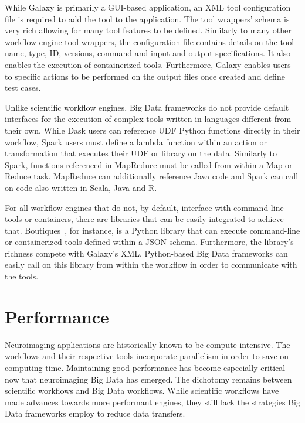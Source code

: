             While Galaxy is primarily a GUI-based application, an XML tool
            configuration file is required to add the tool to the application.
            The tool wrappers' schema is very rich allowing for many tool
            features to be defined. Similarly to many other workflow engine tool
            wrappers, the configuration file contains details on the tool name,
            type, ID, versions, command and input and output specifications. It
            also enables the execution of containerized tools. Furthermore,
            Galaxy enables users to specific actions to be performed on the
            output files once created and define test cases.

            Unlike scientific workflow engines, Big Data frameworks do not
            provide default interfaces for the execution of complex tools
            written in languages different from their own. While Dask users can
            reference UDF Python functions directly in their workflow, Spark
            users must define a lambda function within an action or
            transformation that executes their UDF or library on the data.
            Similarly to Spark, functions referenced in MapReduce must be called
            from within a Map or Reduce task. MapReduce can additionally
            reference Java code and Spark can call on code also written in
            Scala, Java and R.

            For all workflow engines that do not, by default, interface with
            command-line tools or containers, there are libraries that can be
            easily integrated to achieve that.
            Boutiques~\cite{doi:10.1093/gigascience/giy016}, for instance, is a
            Python library that can execute command-line or containerized tools
            defined within a JSON schema. Furthermore, the library's richness
            compete with Galaxy's XML. Python-based Big Data frameworks can
            easily call on this library from within the workflow in order to
            communicate with the tools.

            
    \section{Performance}\label{performance} Neuroimaging applications are
        historically known to be compute-intensive. The workflows and their
        respective tools incorporate parallelism in order to save on
        computing time. Maintaining good performance has become especially
        critical now that neuroimaging Big Data has emerged. The dichotomy
        remains between scientific workflows and Big Data workflows. While
        scientific workflows have made advances towards more performant engines,
        they still lack the strategies Big Data frameworks employ to reduce data
        transfers. 
        
